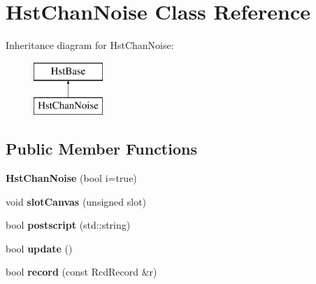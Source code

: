 \section{Hst\-Chan\-Noise Class Reference}
\label{classHstChanNoise}
Inheritance diagram for Hst\-Chan\-Noise\-:\begin{figure}[H]
\begin{center}
\leavevmode
\includegraphics[height=2.000000cm]{classHstChanNoise}
\end{center}
\end{figure}
\subsection*{Public Member Functions}
\begin{DoxyCompactItemize}
\item 
{\bfseries Hst\-Chan\-Noise} (bool i=true)\label{classHstChanNoise_a586bcb45dc76e29586a3f79bb59bbe8f}

\item 
void {\bfseries slot\-Canvas} (unsigned slot)\label{classHstChanNoise_a8fb12b44a7564921e59e1300ad8f7ab2}

\item 
bool {\bfseries postscript} (std\-::string)\label{classHstChanNoise_a2fab50c4976f17c718e7f9cb0ca1694a}

\item 
bool {\bfseries update} ()\label{classHstChanNoise_a33aecd229ce83bb779fc0dab34e80b8b}

\item 
bool {\bfseries record} (const Rcd\-Record \&r)\label{classHstChanNoise_a188b2650b4d8831ac6f5b0898afa3238}

\end{DoxyCompactItemize}
